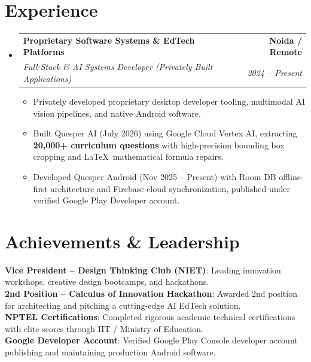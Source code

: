 \documentclass[letterpaper,10pt]{article}
\makeatletter
\newcommand{\resumeItem}[1]{
  \item\small{
    {#1 \vspace{-2pt}}
  }
}
\newcommand{\resumeSubheading}[4]{
  \vspace{-2pt}\item
    \begin{tabular*}{0.98\textwidth}[t]{l@{\extracolsep{\fill}}r}
      \textbf{#1} & \textbf{\small #2} \\
      \textit{\small#3} & \textit{\small #4} \\
    \end{tabular*}\vspace{-5pt}
}
\newcommand{\resumeSubHeadingListStart}{\begin{itemize}[leftmargin=0.15in, label={}]}
\newcommand{\resumeSubHeadingListEnd}{\end{itemize}}
\newcommand{\resumeItemListStart}{\begin{itemize}[leftmargin=0.15in]}
\newcommand{\resumeItemListEnd}{\end{itemize}\vspace{-5pt}}
\makeatother
\begin{document}
\section{Experience}
  \resumeSubHeadingListStart
    \resumeSubheading
      {Proprietary Software Systems \& EdTech Platforms}{Noida / Remote}
      {Full-Stack \& AI Systems Developer (Privately Built Applications)}{2024 -- Present}
      \resumeItemListStart
        \resumeItem{Privately developed proprietary desktop developer tooling, multimodal AI vision pipelines, and native Android software.}
        \resumeItem{Built Quesper AI (July 2026) using Google Cloud Vertex AI, extracting \textbf{20,000+ curriculum questions} with high-precision bounding box cropping and \LaTeX\ mathematical formula repairs.}
        \resumeItem{Developed Quesper Android (Nov 2025 -- Present) with Room DB offline-first architecture and Firebase cloud synchronization, published under verified Google Play Developer account.}
      \resumeItemListEnd
  \resumeSubHeadingListEnd

\section{Achievements \& Leadership}
 \begin{itemize}[leftmargin=0.15in, label={}]
    \small{\item{
     \textbf{Vice President -- Design Thinking Club (NIET)}{: Leading innovation workshops, creative design bootcamps, and hackathons.} \\
     \textbf{2nd Position -- Calculus of Innovation Hackathon}{: Awarded 2nd position for architecting and pitching a cutting-edge AI EdTech solution.} \\
     \textbf{NPTEL Certifications}{: Completed rigorous academic technical certifications with elite scores through IIT / Ministry of Education.} \\
     \textbf{Google Developer Account}{: Verified Google Play Console developer account publishing and maintaining production Android software.}
    }}
 \end{itemize}

\end{document}

